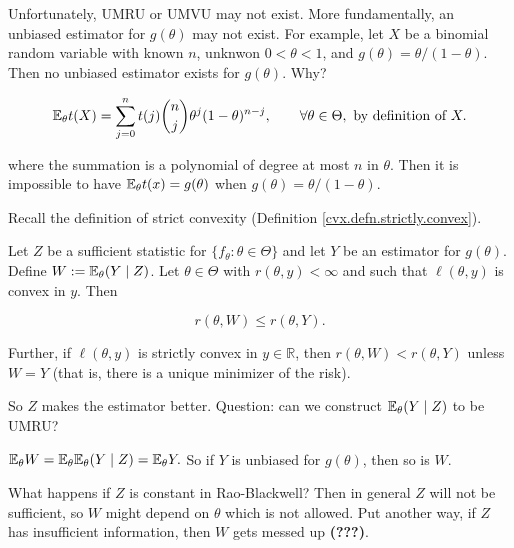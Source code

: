 \begin{remark} Unfortunately, UMRU or UMVU may not exist. More fundamentally, an unbiased estimator for \(g(\theta)\) may not exist. For example, let \(X\) be a binomial random variable with known \(n\), unknwon \(0 < \theta < 1\), and \(g(\theta) = \theta/(1-\theta)\). Then no unbiased estimator exists for \(g(\theta)\). Why?

\[
\E_\theta t(X) = \sum_{j=0}^n t(j) \binom{n}{j}\theta^j(1 -\theta)^{n-j}, \qquad \forall \theta \in \Theta, \text{ by definition of } X.
\]

where the summation is a polynomial of degree at most \(n\) in \(\theta\). Then it is impossible to have \(\E_\theta t(x) = g(\theta)\) when \(g(\theta) = \theta/(1-\theta)\).

\end{remark}

Recall the definition of strict convexity (Definition \ref{cvx.defn.strictly.convex}). 

\begin{theorem} Let \(Z\) be a sufficient statistic for \(\{f_\theta:\theta \in \Theta\}\) and let \(Y\) be an estimator for \(g(\theta)\). Define \(W:= \E_\theta(Y \mid Z)\). Let \(\theta \in \Theta\) with \(r(\theta, y) < \infty\) and such that \(\ell(\theta, y)\) is convex in \(y\). Then

\[
r(\theta, W) \leq r(\theta, Y).
\]

Further, if  \(\ell(\theta, y)\) is strictly convex in \(y \in \mathbb{R}\), then \(r(\theta, W) < r(\theta, Y)\) unless \(W = Y\) (that is, there is a unique minimizer of the risk).

\end{theorem}

So \(Z\) makes the estimator better. Question: can we construct \(\E_\theta(Y \mid Z)\) to be UMRU?

\begin{remark} \(\E_\theta W = \E_\theta \E_\theta(Y \mid Z) = \E_\theta Y.\) So if \(Y\) is unbiased for \(g(\theta)\), then so is \(W\).

\end{remark}

\begin{remark} What happens if \(Z\) is constant in Rao-Blackwell? Then in general \(Z\) will not be sufficient, so \(W\) might depend on \(\theta\) which is not allowed. Put another way, if \(Z\) has insufficient information, then \(W\) gets messed up \textbf{(???)}.

\end{remark}

